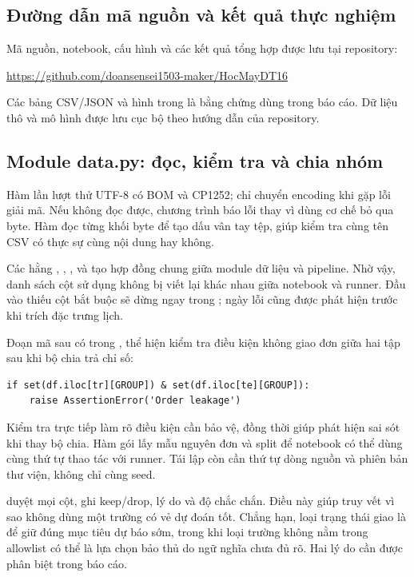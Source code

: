 \subsection{Đường dẫn mã nguồn và kết quả thực nghiệm}
Mã nguồn, notebook, cấu hình và các kết quả tổng hợp được lưu tại repository:
\begin{center}
\url{https://github.com/doansensei1503-maker/HocMayDT16}
\end{center}
Các bảng CSV/JSON và hình trong  là bằng chứng dùng trong báo cáo.
Dữ liệu thô và mô hình được lưu cục bộ theo hướng dẫn của repository.

\subsection{Module data.py: đọc, kiểm tra và chia nhóm}
Hàm  lần lượt thử UTF-8 có BOM và CP1252; chỉ chuyển encoding
khi gặp lỗi giải mã. Nếu không đọc được, chương trình báo lỗi thay vì dùng
cơ chế bỏ qua byte. Hàm  đọc từng khối byte để tạo dấu vân tay
tệp, giúp kiểm tra cùng tên CSV có thực sự cùng nội dung hay không.

Các hằng , , ,  và 
tạo hợp đồng chung giữa module dữ liệu và pipeline. Nhờ vậy, danh sách
cột sử dụng không bị viết lại khác nhau giữa notebook và runner. Đầu vào
thiếu cột bắt buộc sẽ dừng ngay trong ; ngày lỗi cũng được
phát hiện trước khi trích đặc trưng lịch.

Đoạn mã sau có trong , thể hiện kiểm tra điều kiện
không giao đơn giữa hai tập sau khi bộ chia trả chỉ số:
\begin{verbatim}
if set(df.iloc[tr][GROUP]) & set(df.iloc[te][GROUP]):
    raise AssertionError('Order leakage')
\end{verbatim}
Kiểm tra trực tiếp làm rõ điều kiện cần bảo vệ, đồng thời giúp phát hiện
sai sót khi thay bộ chia. Hàm  gói lấy mẫu nguyên đơn
và split để notebook có thể dùng cùng thứ tự thao tác với runner. Tái lập
còn cần thứ tự dòng nguồn và phiên bản thư viện, không chỉ cùng seed.

 duyệt mọi cột, ghi keep/drop, lý do và độ chắc chắn.
Điều này giúp truy vết vì sao không dùng một trường có vẻ dự đoán tốt.
Chẳng hạn, loại trạng thái giao là để giữ đúng mục tiêu dự báo sớm, trong
khi loại trường không nằm trong allowlist có thể là lựa chọn bảo thủ do
ngữ nghĩa chưa đủ rõ. Hai lý do cần được phân biệt trong báo cáo.

